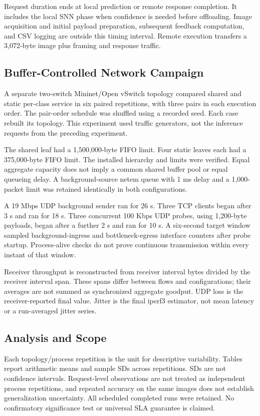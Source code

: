 \documentclass[journal]{IEEEtran}
\begin{document}
Request duration ends at local prediction or remote response completion. It includes the local SNN phase when confidence is needed before offloading. Image acquisition and initial payload preparation, subsequent feedback computation, and CSV logging are outside this timing interval. Remote execution transfers a 3,072-byte image plus framing and response traffic.

\subsection{Buffer-Controlled Network Campaign}
A separate two-switch Mininet/Open vSwitch topology compared shared and static per-class service in six paired repetitions, with three pairs in each execution order. The pair-order schedule was shuffled using a recorded seed. Each case rebuilt its topology. This experiment used traffic generators, not the inference requests from the preceding experiment.

The shared leaf had a 1,500,000-byte FIFO limit. Four static leaves each had a 375,000-byte FIFO limit. The installed hierarchy and limits were verified. Equal aggregate capacity does not imply a common shared buffer pool or equal queueing delay. A background-source netem queue with 1 ms delay and a 1,000-packet limit was retained identically in both configurations.

A 19 Mbps UDP background sender ran for 26 s. Three TCP clients began after 3 s and ran for 18 s. Three concurrent 100 Kbps UDP probes, using 1,200-byte payloads, began after a further 2 s and ran for 10 s. A six-second target window sampled background-ingress and bottleneck-egress interface counters after probe startup. Process-alive checks do not prove continuous transmission within every instant of that window.

Receiver throughput is reconstructed from receiver interval bytes divided by the receiver interval span. These spans differ between flows and configurations; their averages are not summed as synchronized aggregate goodput. UDP loss is the receiver-reported final value. Jitter is the final iperf3 estimator, not mean latency or a run-averaged jitter series.

\subsection{Analysis and Scope}
Each topology/process repetition is the unit for descriptive variability. Tables report arithmetic means and sample SDs across repetitions. SDs are not confidence intervals. Request-level observations are not treated as independent process repetitions, and repeated accuracy on the same images does not establish generalization uncertainty. All scheduled completed runs were retained. No confirmatory significance test or universal SLA guarantee is claimed.
\end{document}

